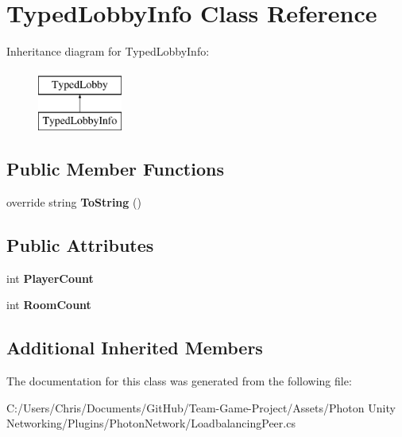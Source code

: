 \hypertarget{class_typed_lobby_info}{}\section{Typed\+Lobby\+Info Class Reference}
\label{class_typed_lobby_info}
Inheritance diagram for Typed\+Lobby\+Info\+:\begin{figure}[H]
\begin{center}
\leavevmode
\includegraphics[height=2.000000cm]{class_typed_lobby_info}
\end{center}
\end{figure}
\subsection*{Public Member Functions}
\begin{DoxyCompactItemize}
\item 
override string {\bfseries To\+String} ()\hypertarget{class_typed_lobby_info_afc589242ac6c9946eb6b5cea6fcf9d81}{}\label{class_typed_lobby_info_afc589242ac6c9946eb6b5cea6fcf9d81}

\end{DoxyCompactItemize}
\subsection*{Public Attributes}
\begin{DoxyCompactItemize}
\item 
int {\bfseries Player\+Count}\hypertarget{class_typed_lobby_info_a5b7b6fb52a3b9813e8b2af49459c6475}{}\label{class_typed_lobby_info_a5b7b6fb52a3b9813e8b2af49459c6475}

\item 
int {\bfseries Room\+Count}\hypertarget{class_typed_lobby_info_a948789896eb6815a2628681f338d754b}{}\label{class_typed_lobby_info_a948789896eb6815a2628681f338d754b}

\end{DoxyCompactItemize}
\subsection*{Additional Inherited Members}


The documentation for this class was generated from the following file\+:\begin{DoxyCompactItemize}
\item 
C\+:/\+Users/\+Chris/\+Documents/\+Git\+Hub/\+Team-\/\+Game-\/\+Project/\+Assets/\+Photon Unity Networking/\+Plugins/\+Photon\+Network/Loadbalancing\+Peer.\+cs\end{DoxyCompactItemize}
